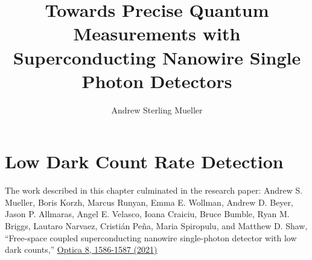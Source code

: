 \documentclass[11pt]{caltech_thesis} %
\begin{document}
\title{Towards Precise Quantum Measurements with Superconducting
Nanowire Single Photon Detectors}
\author{Andrew Sterling Mueller}
\address{Pasadena, California}                     
       




\maketitle[logo]

\begin{acknowledgements}   
    
\end{acknowledgements}

\begin{abstract}
   
\end{abstract}

\begin{publishedcontent}

\end{publishedcontent}

\tableofcontents
\listoffigures
\listoftables
\printnomenclature
\mainmatter

\hypertarget{low-dark-count-rate-detection}{%
\chapter{Low Dark Count Rate
Detection}\label{low-dark-count-rate-detection}}

The work described in this chapter culminated in the research paper:
Andrew S. Mueller, Boris Korzh, Marcus Runyan, Emma E. Wollman, Andrew
D. Beyer, Jason P. Allmaras, Angel E. Velasco, Ioana Craiciu, Bruce
Bumble, Ryan M. Briggs, Lautaro Narvaez, Cristián Peña, Maria Spiropulu,
and Matthew D. Shaw, ``Free-space coupled superconducting nanowire
single-photon detector with low dark counts,''
\href{https://opg.optica.org/optica/fulltext.cfm?uri=optica-8-12-1586\&id=465726}{Optica
8, 1586-1587 (2021)}
\end{document}
